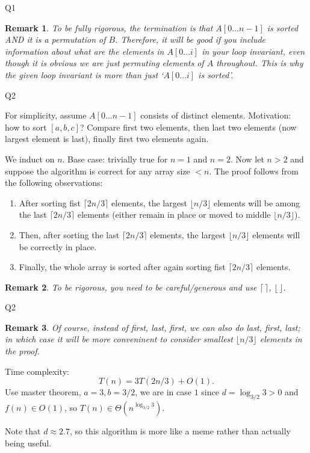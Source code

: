 \documentclass{scratcl}
\newtheorem{remark}{Remark}
\begin{document}
\begin{frame}{Q1}
  \begin{remark}
    To be fully rigorous, the termination is that $A[0 \dots n-1]$ is sorted AND it is a permutation of $B$. Therefore, it will be good if you include information about what are the elements in $A[0 \dots i]$ in your loop invariant, even though it is obvious we are just permuting elements of $A$ throughout. This is why the given loop invariant is more than just `$A[0\dots i]$ is sorted'. 
  \end{remark}
\end{frame}
\begin{frame}[fragile]{Q2}
  \iffalse StoogeSort on array $A[0\dots N-1]$:
  \begin{lstlisting}
    if n=2 and A[0]>A[1] then
      Swap A[0] and A[1]

    if n>2 then 
      Apply StoogeSort to sort the first 
  \end{lstlisting}
  \fi 
  For simplicity, assume $A[0 \dots n-1]$ consists of distinct elements. 
  Motivation: how to sort $[a, b, c]$? Compare first two elements, then last two elements (now largest element is last), finally first two elements again. 
  \par We induct on $n$. Base case: trivially true for $n=1$ and $n=2$. Now let $n>2$ and suppose the algorithm is correct for any array size $<n$. The proof follows from the following observations: 
  \begin{enumerate}
    \item After sorting fist $\lceil 2n/3\rceil$ elements, the largest $\lfloor n/3 \rfloor$ elements will be among the last $\lceil 2n/3\rceil$ elements (either remain in place or moved to middle $\lfloor n/3 \rfloor$). 
    \item Then, after sorting the last $\lceil 2n/3\rceil$ elements, the largest $\lfloor n/3 \rfloor$ elements will be correctly in place. 
    \item Finally, the whole array is sorted after again sorting fist $\lceil 2n/3\rceil$ elements. 
  \end{enumerate}
  \begin{remark}
    To be rigorous, you need to be careful/generous and use $\lceil \,\rceil$, $\lfloor \, \rfloor$. 
  \end{remark}
\end{frame}
\begin{frame}{Q2}
  \begin{remark}
    Of course, instead of first, last, first, we can also do last, first, last; in which case it will be more conveninent to consider smallest $\lfloor n/3 \rfloor$ elements in the proof. 
  \end{remark}
  Time complexity: 
  \[T(n) = 3T(2n/3)+O(1). \]
  Use master theorem, $a=3, b=3/2$, we are in case $1$ since $d=\log_{3/2}{3}>0$ and $f(n) \in O(1)$, so $T(n) \in \Theta(n^{\log_{3/2}{3}})$.
  \par Note that $d \approx 2.7$, so this algorithm is more like a meme rather than actually being useful.  
\end{frame}
\end{document}
